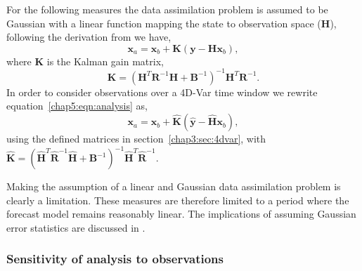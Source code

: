 For the following measures the data assimilation problem is assumed to be Gaussian with a linear function mapping the state to  observation space (\textbf{H}), following the derivation from \citet{kalnay2003atmospheric} we have,
\begin{equation}
\textbf{x}_{a} = \textbf{x}_{b} + \textbf{K}(\textbf{y} - \textbf{H}\textbf{x}_{b}), \label{chap5:eqn:analysis}
\end{equation}
where $\textbf{K}$ is the Kalman gain matrix,
\begin{equation}
\textbf{K} = (\textbf{H}^{T}\textbf{R}^{-1}\textbf{H} + \textbf{B}^{-1})^{-1}\textbf{H}^{T}\textbf{R}^{-1}.
\end{equation}
In order to consider observations over a 4D-Var time window we rewrite equation~\eqref{chap5:eqn:analysis} as,
\begin{equation}
\textbf{x}_{a} = \textbf{x}_{b} + \hat{\textbf{K}}(\hat{\textbf{y}} - \hat{\textbf{H}}\textbf{x}_{b}),
\end{equation}
using the defined matrices in section~\ref{chap3:sec:4dvar}, with $\hat{\textbf{K}} = (\hat{\textbf{H}}^{T}\hat{\textbf{R}}^{-1}\hat{\textbf{H}} + \textbf{B}^{-1})^{-1}\hat{\textbf{H}}^{T}\hat{\textbf{R}}^{-1}.$ 

Making the assumption of a linear and Gaussian data assimilation problem is clearly a limitation. These measures are therefore limited to a period where the forecast model remains reasonably linear. The implications of assuming Gaussian error statistics are discussed in \citet{Fowler2013}.



\subsubsection{Sensitivity of analysis to observations} \label{chap5:sec:inf_mat}

